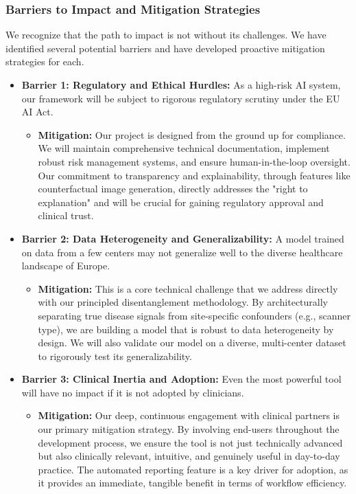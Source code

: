 \documentclass[11pt, a4paper]{article}
\begin{document}
\subsubsection{Barriers to Impact and Mitigation Strategies}

We recognize that the path to impact is not without its challenges. We have identified several potential barriers and have developed proactive mitigation strategies for each.

\begin{itemize}
    \item \textbf{Barrier 1: Regulatory and Ethical Hurdles:} As a high-risk AI system, our framework will be subject to rigorous regulatory scrutiny under the EU AI Act.
    \begin{itemize}
        \item \textbf{Mitigation:} Our project is designed from the ground up for compliance. We will maintain comprehensive technical documentation, implement robust risk management systems, and ensure human-in-the-loop oversight. Our commitment to transparency and explainability, through features like counterfactual image generation, directly addresses the "right to explanation" and will be crucial for gaining regulatory approval and clinical trust.
    \end{itemize}

    \item \textbf{Barrier 2: Data Heterogeneity and Generalizability:} A model trained on data from a few centers may not generalize well to the diverse healthcare landscape of Europe.
    \begin{itemize}
        \item \textbf{Mitigation:} This is a core technical challenge that we address directly with our principled disentanglement methodology. By architecturally separating true disease signals from site-specific confounders (e.g., scanner type), we are building a model that is robust to data heterogeneity by design. We will also validate our model on a diverse, multi-center dataset to rigorously test its generalizability.
    \end{itemize}

    \item \textbf{Barrier 3: Clinical Inertia and Adoption:} Even the most powerful tool will have no impact if it is not adopted by clinicians.
    \begin{itemize}
        \item \textbf{Mitigation:} Our deep, continuous engagement with clinical partners is our primary mitigation strategy. By involving end-users throughout the development process, we ensure the tool is not just technically advanced but also clinically relevant, intuitive, and genuinely useful in day-to-day practice. The automated reporting feature is a key driver for adoption, as it provides an immediate, tangible benefit in terms of workflow efficiency.
    \end{itemize}
\end{itemize}
\end{document}
